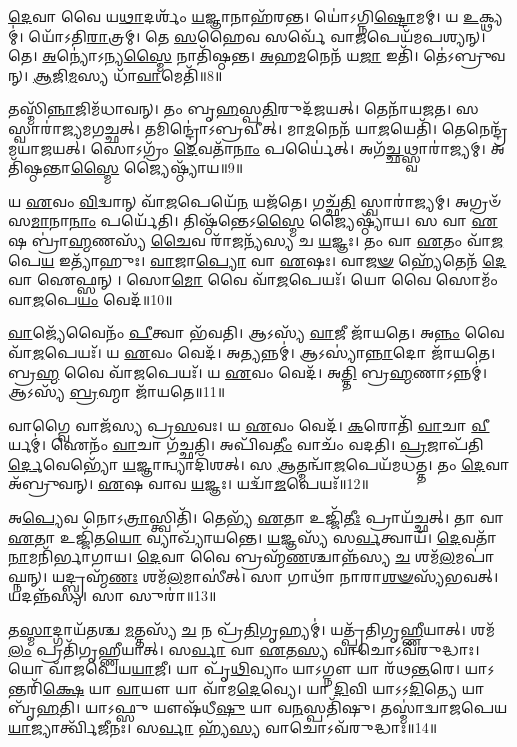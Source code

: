 \-\ul{𑌦𑍇}\-𑌵𑌾 𑌵𑍈 𑌯\-\ul{𑌥𑌾}\-𑌦𑌰𑍍\mbox{}𑌶𑌂᳴ \ul{𑌯}\-𑌜𑍍𑌞𑌾𑌨𑌾𑌹᳴𑌰𑌨𑍍𑌤।
𑌯𑍋॑𑌽𑌗𑍍𑌨𑌿\-\ul{𑌷𑍍𑌟𑍋}\-𑌮𑌮𑍍।
𑌯 \ul{𑌉}\-𑌕𑍍𑌥𑍍𑌯𑌮𑍍॑।
𑌯𑍋᳴𑌽𑌤𑌿\-\ul{𑌰𑌾}\-𑌤𑍍𑌰𑌮𑍍।
𑌤𑍇 \ul{𑌸}\-𑌹𑍈𑌵 𑌸𑌰𑍍𑌵𑍇᳴ 𑌵𑌾\-\ul{𑌜}\-𑌪𑍇𑌯᳴𑌮𑌪𑌶𑍍𑌯𑌨𑍍।
𑌤𑍇।
\-\ul{𑌅}\-𑌨𑍍𑌯𑍋॑\-𑌽𑌨𑍍𑌯\-\ul{𑌸𑍍𑌮𑍈} 𑌨𑌾𑌤𑌿᳴𑌷𑍍𑌠𑌨𑍍𑌤।
\-\ul{𑌅}\-𑌹\-\ul{𑌮}\-𑌨𑍇𑌨᳴ 𑌯\-\ul{𑌜𑌾} 𑌇𑌤𑌿᳴।
𑌤𑍇॑𑌽𑌬𑍍𑌰𑍁𑌵𑌨𑍍।
\-\ul{𑌆}\-𑌜𑌿\-\ul{𑌮}\-𑌸𑍍𑌯 𑌧𑌾᳴\-\ul{𑌵𑌾}\-𑌮𑍇𑌤𑌿᳴॥8॥

𑌤𑌸𑍍𑌮𑌿᳴\-\ul{𑌨𑍍𑌨𑌾}\-𑌜𑌿𑌮᳴𑌧𑌾𑌵𑌨𑍍।
𑌤𑌂 𑌬𑍃\-\ul{𑌹}\-𑌸𑍍𑌪\-\ul{𑌤𑌿}\-𑌰𑍁𑌦᳴𑌜𑌯𑌤𑍍।
𑌤𑍇𑌨𑌾᳴𑌯𑌜𑌤।
𑌸 𑌸𑍍𑌵𑌾𑌰𑌾॑𑌜𑍍𑌯𑌮𑌗𑌚𑍍𑌛𑌤𑍍।
𑌤𑌮𑌿𑌨𑍍𑌦𑍍𑌰𑍋॑\-𑌽𑌬𑍍𑌰𑌵𑍀𑌤𑍍।
𑌮𑌾\-\ul{𑌮}\-𑌨𑍇𑌨᳴ 𑌯𑌾\-\ul{𑌜}\-𑌯𑍇𑌤𑌿᳴।
𑌤𑍇𑌨𑍇𑌨𑍍𑌦𑍍𑌰᳴𑌮𑌯𑌾𑌜𑌯𑌤𑍍।
𑌸𑍋𑌽𑌗𑍍𑌰𑌂᳴ \ul{𑌦𑍇}\-𑌵𑌤𑌾᳴\-\ul{𑌨𑌾𑌂} 𑌪𑌰𑍍𑌯𑍈॑𑌤𑍍।
𑌅𑌗᳴\-\ul{𑌚𑍍𑌛}\-𑌥𑍍𑌸𑍍𑌵𑌾𑌰𑌾॑𑌜𑍍𑌯𑌮𑍍।
𑌅𑌤𑌿᳴𑌷𑍍𑌠𑌨𑍍𑌤𑌾\-\ul{𑌸𑍍𑌮𑍈} 𑌜𑍍𑌯𑍈𑌷𑍍𑌠𑍍𑌯𑌾᳴𑌯॥9॥

𑌯 \ul{𑌏}\-𑌵𑌂 \ul{𑌵𑌿}\-𑌦𑍍𑌵𑌾𑌨𑍍 𑌵𑌾᳴\-\ul{𑌜}\-𑌪𑍇𑌯𑍇᳴\-\ul{𑌨} 𑌯𑌜᳴𑌤𑍇।
𑌗𑌚𑍍𑌛᳴\-\ul{𑌤𑌿} 𑌸𑍍𑌵𑌾𑌰𑌾॑𑌜𑍍𑌯𑌮𑍍।
𑌅𑌗𑍍𑌰𑍞᳴ 𑌸\-\ul{𑌮𑌾}\-𑌨𑌾\-\ul{𑌨𑌾𑌂} 𑌪𑌰𑍍𑌯𑍇᳴𑌤𑌿।
𑌤𑌿𑌷𑍍𑌠᳴𑌨𑍍𑌤𑍇\-𑌽\-\ul{𑌸𑍍𑌮𑍈} 𑌜𑍍𑌯𑍈𑌷𑍍𑌠𑍍𑌯𑌾᳴𑌯।
𑌸 𑌵𑌾 \ul{𑌏}\-𑌷 𑌬𑍍𑌰𑌾॑\-\ul{𑌹𑍍𑌮}\-𑌣𑌸𑍍𑌯᳴ \ul{𑌚𑍈}\-𑌵 𑌰𑌾᳴\-\ul{𑌜}\-𑌨𑍍𑌯᳴𑌸𑍍𑌯 𑌚 \ul{𑌯}\-𑌜𑍍𑌞𑌃।
𑌤𑌂 𑌵𑌾 \ul{𑌏}\-𑌤𑌂 𑌵𑌾᳴\-\ul{𑌜}\-𑌪𑍇\-\ul{𑌯} 𑌇𑌤𑍍𑌯𑌾᳴𑌹𑍁𑌃।
\-\ul{𑌵𑌾}\-𑌜𑌾\-\ul{𑌪𑍍𑌯𑍋} 𑌵𑌾 \ul{𑌏}\-𑌷𑌃।
𑌵𑌾\-\ul{𑌜}\-\-\ul{𑍟} 𑌹𑍍𑌯𑍇᳴𑌤𑍇𑌨᳴ \ul{𑌦𑍇}\-𑌵𑌾 𑌐𑌫𑍍𑌸𑌨𑍍।
𑌸𑍋\-\ul{𑌮𑍋} 𑌵𑍈 𑌵𑌾᳴\-\ul{𑌜}\-𑌪𑍇𑌯𑌃᳴।
𑌯𑍋 𑌵𑍈 𑌸𑍋𑌮𑌂᳴ 𑌵𑌾\-\ul{𑌜}\-𑌪𑍇\-\ul{𑌯𑌂} 𑌵𑍇𑌦᳴॥10॥

\-\ul{𑌵𑌾}\-𑌜𑍍𑌯𑍇᳴𑌵𑍈𑌨𑌂᳴ \ul{𑌪𑍀}\-𑌤𑍍𑌵𑌾 𑌭᳴𑌵𑌤𑌿।
𑌆𑌽𑌸𑍍𑌯᳴ \ul{𑌵𑌾}\-𑌜𑍀 𑌜𑌾᳴𑌯𑌤𑍇।
𑌅\-\ul{𑌨𑍍𑌨𑌂} 𑌵𑍈 𑌵𑌾᳴\-\ul{𑌜}\-𑌪𑍇𑌯𑌃᳴।
𑌯 \ul{𑌏}\-𑌵𑌂 𑌵𑍇𑌦᳴।
𑌅𑌤𑍍𑌯𑌨𑍍𑌨𑌮𑍍॑।
𑌆𑌽𑌸𑍍𑌯𑌾॑\-\ul{𑌨𑍍𑌨𑌾}\-𑌦𑍋 𑌜𑌾᳴𑌯𑌤𑍇।
𑌬𑍍𑌰\-\ul{𑌹𑍍𑌮} 𑌵𑍈 𑌵𑌾᳴\-\ul{𑌜}\-𑌪𑍇𑌯𑌃᳴।
𑌯 \ul{𑌏}\-𑌵𑌂 𑌵𑍇𑌦᳴।
𑌅\-\ul{𑌤𑍍𑌤𑌿} 𑌬𑍍𑌰\-\ul{𑌹𑍍𑌮}\-𑌣𑌾\-𑌽𑌨𑍍𑌨𑌮𑍍॑।
𑌆𑌽𑌸𑍍𑌯᳴ \ul{𑌬𑍍𑌰}\-𑌹𑍍𑌮𑌾 𑌜𑌾᳴𑌯𑌤𑍇॥11॥

𑌵𑌾𑌗𑍍𑌵𑍈 𑌵𑌾𑌜᳴𑌸𑍍𑌯 𑌪𑍍𑌰\-\ul{𑌸}\-𑌵𑌃।
𑌯 \ul{𑌏}\-𑌵𑌂 𑌵𑍇𑌦᳴।
\-\ul{𑌕}\-𑌰𑍋𑌤𑌿᳴ \ul{𑌵𑌾}\-𑌚𑌾 \ul{𑌵𑍀}\-𑌰𑍍𑌯𑌮𑍍॑।
𑌐𑌨𑌂᳴ \ul{𑌵𑌾}\-𑌚𑌾 𑌗᳴𑌚𑍍𑌛𑌤𑌿।
𑌅𑌪𑌿᳴𑌵\-\ul{𑌤𑍀𑌂} 𑌵𑌾𑌚𑌂᳴ 𑌵𑌦𑌤𑌿।
\-\ul{𑌪𑍍𑌰}\-𑌜𑌾𑌪᳴𑌤𑌿\-\ul{𑌰𑍍𑌦𑍇}\-𑌵𑍇𑌭𑍍𑌯𑍋᳴ \ul{𑌯}\-𑌜𑍍𑌞𑌾𑌨𑍍𑌵𑍍𑌯𑌾𑌦𑌿᳴𑌶𑌤𑍍।
𑌸 \ul{𑌆}\-𑌤𑍍𑌮𑌨𑍍𑌵𑌾᳴\-\ul{𑌜}\-𑌪𑍇𑌯᳴𑌮𑌧𑌤𑍍𑌤।
𑌤𑌂 \ul{𑌦𑍇}\-𑌵𑌾 𑌅᳴𑌬𑍍𑌰𑍁𑌵𑌨𑍍।
\-\ul{𑌏}\-𑌷 𑌵𑌾𑌵 \ul{𑌯}\-𑌜𑍍𑌞𑌃।
𑌯𑌦𑍍𑌵𑌾᳴\-\ul{𑌜}\-𑌪𑍇𑌯𑌃᳴॥12॥

𑌅\-\ul{𑌪𑍍𑌯𑍇}\-𑌵 𑌨𑍋𑌽\-\ul{𑌤𑍍𑌰𑌾}\-𑌸𑍍𑌤𑍍𑌵𑌿𑌤𑌿᳴।
𑌤𑍇𑌭𑍍𑌯᳴ \ul{𑌏}\-𑌤𑌾 𑌉𑌜𑍍𑌜𑌿᳴\-\ul{𑌤𑍀𑌃} 𑌪𑍍𑌰𑌾𑌯᳴𑌚𑍍𑌛𑌤𑍍।
𑌤𑌾 𑌵𑌾 \ul{𑌏}\-𑌤𑌾 𑌉𑌜𑍍𑌜𑌿᳴𑌤\-\ul{𑌯𑍋} 𑌵𑍍𑌯𑌾𑌖𑍍𑌯𑌾᳴𑌯𑌨𑍍𑌤𑍇।
\-\ul{𑌯}\-𑌜𑍍𑌞𑌸𑍍𑌯᳴ 𑌸\-\ul{𑌰𑍍𑌵}\-𑌤𑍍𑌵𑌾𑌯᳴।
\-\ul{𑌦𑍇}\-𑌵𑌤𑌾᳴\-\ul{𑌨𑌾}\-𑌮𑌨𑌿᳴𑌰𑍍𑌭𑌾𑌗𑌾𑌯।
\-\ul{𑌦𑍇}\-𑌵𑌾 𑌵𑍈 𑌬𑍍𑌰𑌹𑍍𑌮᳴\-\ul{𑌣}\-𑌶𑍍𑌚𑌾𑌨𑍍𑌨᳴𑌸𑍍𑌯 \ul{𑌚} 𑌶𑌮᳴\-\ul{𑌲}\-𑌮𑌪𑌾॑𑌘𑍍𑌨𑌨𑍍।
𑌯𑌦𑍍𑌬𑍍𑌰𑌹𑍍𑌮᳴\-\ul{𑌣𑌃} 𑌶𑌮᳴\-\ul{𑌲}\-𑌮𑌾𑌸𑍀॑𑌤𑍍।
𑌸𑌾 𑌗𑌾𑌥𑌾᳴ 𑌨𑌾𑌰𑌾\-\ul{𑌶}\-\-\ul{𑍟}\-𑌸𑍍𑌯᳴𑌭𑌵𑌤𑍍।
𑌯𑌦𑌨𑍍𑌨᳴𑌸𑍍𑌯।
𑌸𑌾 𑌸𑍁𑌰𑌾॑॥13॥

𑌤\-\ul{𑌸𑍍𑌮𑌾}\-𑌦𑍍𑌗𑌾𑌯᳴𑌤𑌶𑍍𑌚 \ul{𑌮}\-𑌤𑍍𑌤𑌸𑍍𑌯᳴ \ul{𑌚} 𑌨 𑌪𑍍𑌰᳴\-\ul{𑌤𑌿}\-𑌗𑍃𑌹𑍍𑌯𑌮𑍍॑।
𑌯𑌤𑍍𑌪𑍍𑌰᳴𑌤𑌿𑌗𑍃\-\ul{𑌹𑍍𑌣𑍀}\-𑌯𑌾𑌤𑍍।
𑌶𑌮᳴\-\ul{𑌲𑌂} 𑌪𑍍𑌰𑌤𑌿᳴\-𑌗𑍃𑌹𑍍𑌣𑍀𑌯𑌾𑌤𑍍।
𑌸\-\ul{𑌰𑍍𑌵𑌾} 𑌵𑌾 \ul{𑌏}\-𑌤\-\ul{𑌸𑍍𑌯} 𑌵𑌾𑌚𑍋\-𑌽𑌵᳴𑌰𑍁𑌦𑍍𑌧𑌾𑌃।
𑌯𑍋 𑌵𑌾᳴𑌜𑌪𑍇𑌯\-\ul{𑌯𑌾}\-𑌜𑍀।
𑌯𑌾 𑌪𑍃᳴\-\ul{𑌥𑌿}\-𑌵𑍍𑌯𑌾𑌂 𑌯𑌾𑌽𑌗𑍍𑌨𑍗 𑌯𑌾 𑌰᳴𑌥\-\ul{𑌨𑍍𑌤}\-𑌰𑍇।
𑌯𑌾𑌽𑌨𑍍𑌤𑌰𑌿᳴\-\ul{𑌕𑍍𑌷𑍇} 𑌯𑌾 \ul{𑌵𑌾}\-𑌯𑍗 𑌯𑌾 𑌵𑌾᳴𑌮\-\ul{𑌦𑍇}\-𑌵𑍍𑌯𑍇।
𑌯𑌾 \ul{𑌦𑌿}\-𑌵𑌿 𑌯𑌾𑌽𑌽\-\ul{𑌦𑌿}\-𑌤𑍍𑌯𑍇 𑌯𑌾 𑌬𑍃᳴\-\ul{𑌹}\-𑌤𑌿।
𑌯𑌾𑌽𑌫𑍍𑌸𑍁 𑌯𑍗𑌷᳴𑌧𑍀\-\ul{𑌷𑍁} 𑌯𑌾 𑌵\-\ul{𑌨}\-𑌸𑍍𑌪𑌤𑌿᳴𑌷𑍁।
𑌤𑌸𑍍𑌮𑌾॑𑌦𑍍𑌵𑌾𑌜𑌪𑍇𑌯\-\ul{𑌯𑌾}\-𑌜𑍍𑌯𑌾𑌰𑍍𑌤𑍍𑌵𑌿᳴𑌜𑍀𑌨𑌃।
𑌸\-\ul{𑌰𑍍𑌵𑌾} 𑌹𑍍𑌯᳴\-\ul{𑌸𑍍𑌯} 𑌵𑌾𑌚𑍋\-𑌽𑌵᳴𑌰𑍁𑌦𑍍𑌧𑌾𑌃॥14॥\anuvakamend[\-\ul{𑌧𑌾}\-\-\ul{𑌵𑌾}\-𑌮𑍇\-\ul{𑌤𑌿} 𑌜𑍍𑌯𑍈𑌷𑍍𑌠𑍍𑌯𑌾᳴\-\ul{𑌯} 𑌵𑍇𑌦᳴ \ul{𑌬𑍍𑌰}\-𑌹𑍍𑌮𑌾 𑌜𑌾᳴𑌯𑌤𑍇 𑌵𑌾\-\ul{𑌜}\-𑌪𑍇\-\ul{𑌯𑌃} 𑌸𑍁𑌰𑌾\-𑌽𑌽𑌰𑍍𑌤𑍍𑌵𑌿᳴𑌜𑍀\-\ul{𑌨} 𑌏𑌕𑌂᳴ 𑌚]

